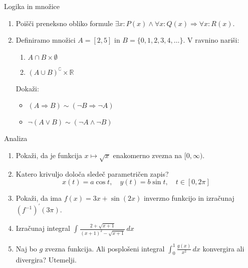 \begin{frame}{Logika in množice}
    \begin{enumerate}
        \item
        Poišči preneksno obliko formule $\exists x : P(x) \wedge \forall x : Q(x) \Rightarrow \forall x : R(x).$
        \item 
        Definiramo množici $A = [2,5]$ in $B = \{0,1,2,3,4,\dots\}$.
        V ravnino nariši:
        \begin{enumerate}
           \item $A\cap B \times \emptyset $
           \item $(A\cup B)^{\complement} \times \mathbb{R}$
        \end{enumerate}
        Dokaži:
        \begin{itemize}
            \item $(A\Rightarrow B) \sim (\lnot B\Rightarrow \lnot A)$
            \item $\lnot (A\lor B) \sim (\lnot A \land \lnot B)$
        \end{itemize}
    \end{enumerate}
\end{frame}

\begin{frame}{Analiza}
    \begin{enumerate}
        \item
        Pokaži, da je funkcija $x\mapsto \sqrt{x}$ enakomerno zvezna na $[0,\infty )$.
        \item 
        Katero krivuljo določa sledeč parametričen zapis?
        $$
           x(t) = a \cos t,\quad %
           y(t) = b \sin t,\quad %
           t \in [0, 2 \pi]
        $$ 
        \item
        Pokaži, da ima $f(x) = 3x + \sin(2x)$ inverzno funkcijo in izračunaj $(f^{-1})^\prime(3\pi).$
        
        \item
        Izračunaj integral 
        $\displaystyle \int_{}^{} \frac{2+\sqrt{x+1}}{(x+1)^2-\sqrt{x+1}} \,dx $
        \item 
        Naj bo $g$ zvezna funkcija. Ali posplošeni integral 
        $\int_{0}^{1} \frac{g(x)}{x^2} \,dx $
        konvergira ali divergira? Utemelji.
    \end{enumerate}
\end{frame}


